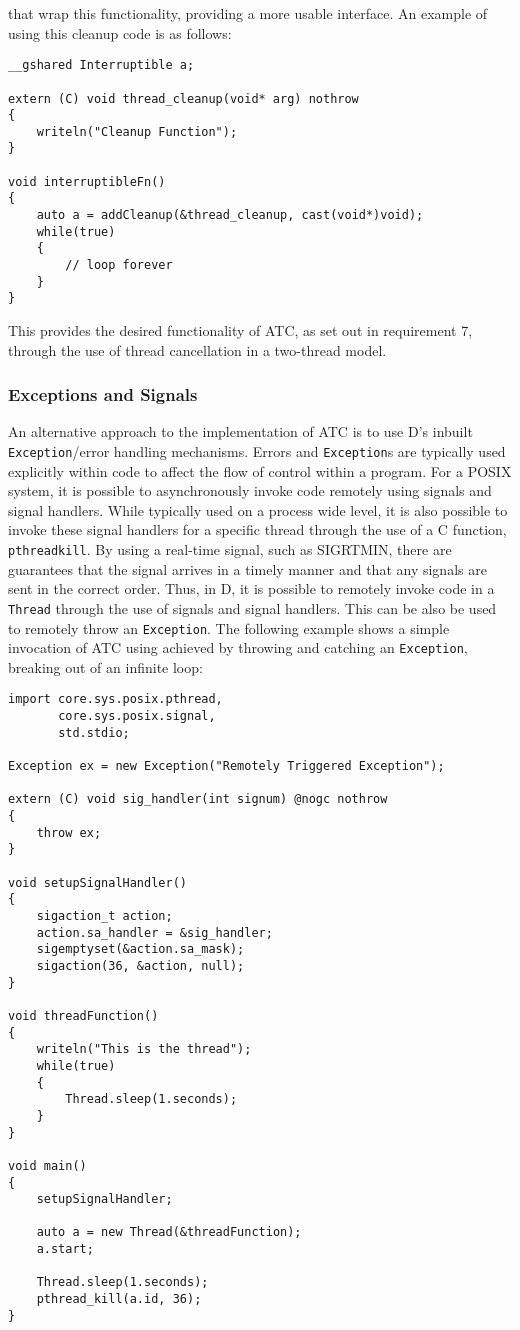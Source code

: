 that wrap this functionality, providing a more usable interface. An example of using 
this cleanup code is as follows: 
\begin{lstlisting}[basicstyle=\small]
__gshared Interruptible a; 

extern (C) void thread_cleanup(void* arg) nothrow
{
    writeln("Cleanup Function");
}

void interruptibleFn()
{
    auto a = addCleanup(&thread_cleanup, cast(void*)void);
    while(true)
    {
        // loop forever
    }
}
\end{lstlisting}
This provides the desired functionality of ATC, as set out in requirement 7, 
through the use of thread cancellation in a two-thread model.

\subsubsection*{Exceptions and Signals}
An alternative approach to the implementation of ATC is to use D's inbuilt \texttt{Exception}/error 
handling mechanisms. Errors and \texttt{Exception}s are typically used explicitly within code 
to affect the flow of control within a program.
For a POSIX system, it is possible to asynchronously invoke code remotely using 
signals and signal handlers. While typically used on a process wide level, it
is also possible to invoke these signal handlers for a specific thread through
the use of a C function, \texttt{pthread\textunderscore{}kill}. By using a
real-time signal, such as SIGRTMIN, there are guarantees that the signal
arrives in a timely manner and that any signals are sent in the correct order. 
Thus, in D, it is possible to remotely invoke code in a \texttt{Thread} through 
the use of signals and signal handlers. This can be also be used to remotely
throw an \texttt{Exception}. The following example shows a simple invocation of ATC
using achieved by throwing and catching an \texttt{Exception}, breaking out of an
infinite loop: 
\begin{lstlisting}[basicstyle=\small]
import core.sys.posix.pthread, 
       core.sys.posix.signal, 
       std.stdio;

Exception ex = new Exception("Remotely Triggered Exception"); 

extern (C) void sig_handler(int signum) @nogc nothrow
{
    throw ex;
}

void setupSignalHandler()
{
    sigaction_t action; 
    action.sa_handler = &sig_handler; 
    sigemptyset(&action.sa_mask);
    sigaction(36, &action, null); 
}

void threadFunction()
{
    writeln("This is the thread"); 
    while(true)
    {
        Thread.sleep(1.seconds);
    }
}

void main()
{
    setupSignalHandler; 

    auto a = new Thread(&threadFunction); 
    a.start; 

    Thread.sleep(1.seconds); 
    pthread_kill(a.id, 36); 
}
\end{lstlisting}
